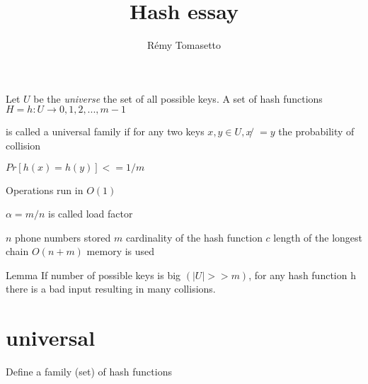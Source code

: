 \documentclass[a4paper]{tufte-handout}
\title{Hash essay}
\author[rto]{Rémy Tomasetto}
\begin{document}
Let $U$ be the \emph{universe} the set of all
possible keys. A set of hash functions
$H = {h : U → { 0 , 1 , 2 , . . . , m − 1 }}$



is called a universal family if for any two keys
$x, y ∈ U, x ̸ = y$ the probability of collision

$Pr [h(x) = h(y )] <= 1/m$






Operations run in $O( 1 )$

$α = m / n$ is called load factor

$n$ phone numbers stored
$m$ cardinality of the hash function
$c$ length of the longest chain
$O(n + m)$
memory is used

Lemma
If number of possible keys is big $( |U| >> m )$,
for any hash function h there is a bad input
resulting in many collisions.



\section{universal}

Define a family (set) of hash functions

\label{sec:universal}
\end{document}
